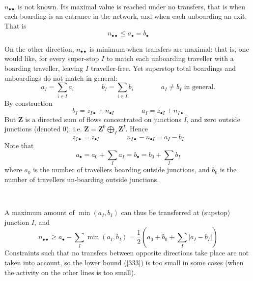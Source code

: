 \documentclass{article}
\theoremstyle{plain}
\begin{document}
\


$n_{\bullet\bullet}$ is not known. Its maximal value is reached under no transfers, that is when each boarding is an entrance in the network, and when each unboarding an exit. That is 
\begin{displaymath}
n_{\bullet\bullet}\le a_{\bullet}=b_{\bullet}
\end{displaymath}



On the other direction, $n_{\bullet\bullet}$ is minimum when transfers are maximal: that is, one would like, for every super-stop $I$  to match each unboarding traveller with a boarding traveller, leaving $I$ traveller-free. Yet  superstop total boardings and unboardings  do not match in general: 
\begin{displaymath}
a_I=\sum_{i\in I}a_i\qquad\qquad b_I=\sum_{i\in I}b_i\qquad\qquad a_I\neq b_I\mbox{ in general.}
\end{displaymath}
By construction 
\begin{equation}
\label{sortir2}
b_I=z_{I\bullet}+n_{\bullet I}
\qquad\qquad a_I=z_{\bullet I}+n_{I\bullet}
\end{equation}
But $\mathbf{Z}$ is a directed sum of flows concentrated on junctions $I$, and zero outside junctions (denoted $0$), i.e. $\mathbf{Z}=\mathbf{Z}^0\bigoplus_I \mathbf{Z}^I $. Hence 
\begin{displaymath}
z_{I\bullet}=z_{\bullet I}\qquad\qquad  n_{I\bullet}-n_{\bullet I}=a_I-b_I
\end{displaymath}
Note that 
\begin{equation}
\label{ }
a_{\bullet}=a_{0}+\sum_{I}a_I=b_{\bullet}=b_{0}+\sum_{I}b_I
\end{equation}
where $a_{0}$ is the number of travellers boarding outside junctions, and $b_{0}$ is the number of travellers un-boarding outside junctions. 



\


A maximum amount of $\min(a_I,b_I)$ can thus be transferred at (supstop) junction $I$, and 
\begin{equation}
\label{333}
n_{\bullet\bullet}\ge  a_{\bullet}-\sum_I \min(a_I,b_I)=\frac12(a_0+b_0+\sum_I |a_I-b_I|)
\end{equation}
Constraints such that no transfers between opposite directions take place are not taken into account, so the lower bound (\ref{333}) is too small in some cases (when the activity on the other lines is too small). 
\end{document}
